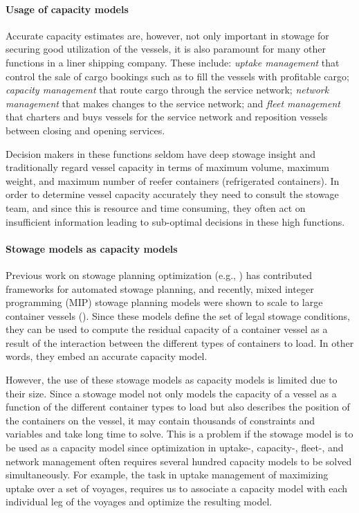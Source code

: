\paragraph{Usage of capacity models}
Accurate capacity estimates are, however, not only important in stowage 
for securing good utilization of the vessels,
it is also paramount for many other functions in a liner shipping company. These include: {\em uptake management} that control the sale of cargo bookings such as to fill the vessels with profitable cargo; {\em capacity management} that route cargo through the service network; {\em network management} that makes changes to the service network; and {\em fleet management} that charters and buys vessels for the service network and reposition vessels between closing and opening services.  

Decision makers in these functions seldom have deep stowage insight and traditionally regard vessel capacity in terms of maximum volume, maximum weight, and maximum number of reefer containers (refrigerated containers). In order to determine vessel capacity accurately they need to consult the stowage team, and since this is resource and time consuming, they often act on insufficient information leading to sub-optimal decisions in these high functions.  

\paragraph{Stowage models as capacity models}
Previous work on stowage planning optimization (e.g., \cite{roach00,kimkang02,ambrosino04,low09,delgado09,pacino12}) has contributed frameworks for automated stowage planning, 
and recently, mixed integer programming (MIP) stowage planning models were shown to scale to large container vessels (\cite{pacino11,AlbertosThesis}). Since these models define the set of legal stowage conditions, they can be used to compute the residual capacity of a container vessel as a result of the interaction between the different types of containers to load. In other words, they embed an accurate capacity model. 

However, the use of these stowage models as capacity models is limited due to their size. Since a stowage model not only models the capacity of a vessel as a function of the different container types to load but also describes the position of the containers on the vessel, it may contain thousands of constraints and variables and take long time to solve. This is a problem if the stowage model is to be used as a capacity model %
since optimization in uptake-, capacity-, fleet-, and network management often requires several hundred capacity models to be solved simultaneously. For example, the task in uptake management of maximizing uptake over a set of voyages, requires us to associate a capacity model with each individual leg of the voyages and optimize the resulting model.  


